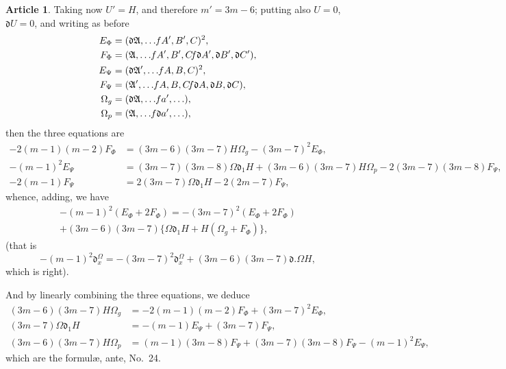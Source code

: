 \documentclass[12pt,a4paper]{article}
\theoremstyle{definition}
\newtheorem{art}{Article}[section]
\begin{document}
\begin{art}
Taking now $U' = H$, and therefore $m' = 3m - 6$; putting also $U = 0$, $\mathfrak{d}U = 0$, and writing as before
\begin{align*}
E_\Phi &= (\mathfrak{d}\mathfrak{A}, \ldots \hspace{-2pt} fA', B', C)^2, \\
F_\Phi &= (\mathfrak{A}, \ldots \hspace{-2pt} fA', B', C \hspace{-2pt} f\mathfrak{d}A', \mathfrak{d}B', \mathfrak{d}C'), \\
E_\Psi &= (\mathfrak{d}\mathfrak{A}', \ldots \hspace{-2pt} fA, B, C)^2, \\
F_\Psi &= (\mathfrak{A}', \ldots \hspace{-2pt} fA, B, C \hspace{-2pt} f\mathfrak{d}A, \mathfrak{d}B, \mathfrak{d}C), \\
\Omega_g &= (\mathfrak{d}\mathfrak{A}, \ldots \hspace{-2pt} fa', \ldots), \\
\Omega_p &= (\mathfrak{A}, \ldots \hspace{-2pt} f\mathfrak{d}a', \ldots),
\end{align*}
then the three equations are
\begin{align*}
-2(m - 1)(m - 2)F_\Phi &= (3m - 6)(3m - 7)H\Omega_g - (3m - 7)^2E_\Phi, \\
-(m - 1)^2E_\Psi &= (3m - 7)(3m - 8)\Omega\mathfrak{d}_1 H + (3m - 6)(3m - 7)H\Omega_p - 2(3m - 7)(3m - 8)F_\Psi, \\
-2(m - 1)F_\Psi &= 2(3m - 7)\Omega\mathfrak{d}_1 H - 2(2m - 7)F_\Psi,
\end{align*}
whence, adding, we have
\begin{multline*}
-(m - 1)^2(E_\Phi + 2F_\Phi) = -(3m - 7)^2(E_\Phi + 2F_\Phi) \\
+ (3m - 6)(3m - 7)\{\Omega\mathfrak{d}_1 H + H(\Omega_g + F_\Phi)\},
\end{multline*}
(that is
\[
-(m - 1)^2\mathfrak{d}_x^\Omega = -(3m - 7)^2\mathfrak{d}_x^\Omega + (3m - 6)(3m - 7)\mathfrak{d}.\Omega H,
\]
which is right).

And by linearly combining the three equations, we deduce
\begin{align*}
(3m - 6)(3m - 7)H\Omega_g &= -2(m - 1)(m - 2)F_\Phi + (3m - 7)^2E_\Phi, \\
(3m - 7)\Omega\mathfrak{d}_1 H &= -(m - 1)E_\Psi + (3m - 7)F_\Psi, \\
(3m - 6)(3m - 7)H\Omega_p &= (m - 1)(3m - 8)F_\Psi + (3m - 7)(3m - 8)F_\Psi - (m - 1)^2E_\Psi,
\end{align*}
which are the formul\ae, ante, No.~24.
\end{art}
\end{document}
